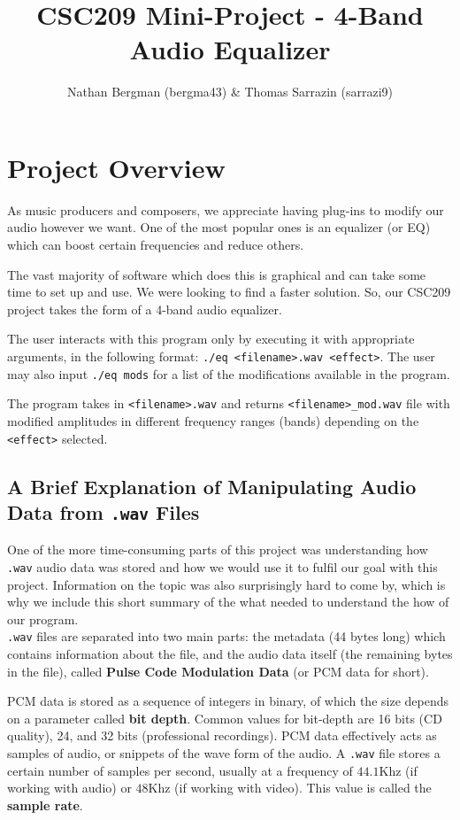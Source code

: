 \documentclass[11pt]{extarticle}
\title{CSC209 Mini-Project - 4-Band Audio Equalizer}
\author{Nathan Bergman (bergma43) & Thomas Sarrazin (sarrazi9)}
\begin{document}
\maketitle

\section{Project Overview}\label{desc}

As music producers and composers, we appreciate having plug-ins to modify our audio however we want. One of the most popular ones is an equalizer (or EQ) which can boost certain frequencies and reduce others. 

The vast majority of software which does this is graphical and can take some time to set up and use. We were looking to find a faster solution. So, our CSC209 project takes the form of a 4-band audio equalizer. 

The user interacts with this program only by executing it with appropriate arguments, in the following format: \texttt{./eq <filename>.wav <effect>}. The user may also input \texttt{./eq mods} for a list of the modifications available in the program.

The program takes in \texttt{<filename>.wav} and returns \texttt{<filename>\_mod.wav} file with modified amplitudes in different frequency ranges (bands) depending on the \texttt{<effect>} selected.

\subsection{A Brief Explanation of Manipulating Audio Data from \texttt{.wav} Files}\label{wav}

One of the more time-consuming parts of this project was understanding how \texttt{.wav} audio data was stored and how we would use it to fulfil our goal with this project. Information on the topic was also surprisingly hard to come by, which is why we include this short summary of the what needed to understand the how of our program. \\

\texttt{.wav} files are separated into two main parts: the metadata (44 bytes long) which contains information about the file, and the audio data itself (the remaining bytes in the file), called \textbf{Pulse Code Modulation Data} (or PCM data for short).

PCM data is stored as a sequence of integers in binary, of which the size depends on a parameter called \textbf{bit depth}. Common values for bit-depth are 16 bits (CD quality), 24, and 32 bits (professional recordings). PCM data effectively acts as samples of audio, or snippets of the wave form of the audio. A \texttt{.wav} file stores a certain number of samples per second, usually at a frequency of $44.1$Khz (if working with audio) or $48$Khz (if working with video). This value is called the \textbf{sample rate}.\\
\end{document}
